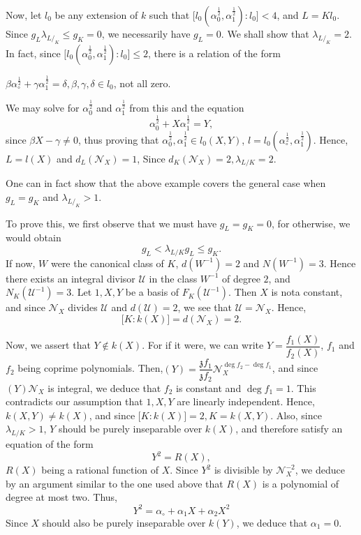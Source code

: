 Now, let $l_0$ be any extension of $k$ such that $\bigg[ l_0
  \left(\alpha^{\frac{1}{2}}_0, \alpha^{\frac{1}{2}}_1\right) : l_0
  \bigg] < 4$, and $L = Kl_0$. Since $g_L \lambda_{L/_K} \leq g_K
= 0$, we necessarily have $g_L = 0$. We shall show that
$\lambda_{L/_K} = 2$. In fact, since $\bigg[ l_0 \left(\alpha
  ^\frac{1}{2}_0, \alpha^{\frac{1}{2}}_1\right) : l_0 \bigg]
\leq 2$, there is a relation of the form 

$\beta \alpha^{\frac{1}{2}}_\circ + \gamma \alpha^{\frac{1}{2}}_1 =
\delta, \beta, \gamma ,\delta \in l_0$, not all zero. 

We may solve for $\alpha^{\frac{1}{2}}_0$ and
$\alpha^{\frac{1}{2}}_1$ from this and the equation 
$$
\alpha^{\frac{1}{2}}_0 + X \alpha^{\frac{1}{2}}_1 = Y,
$$
since $\beta X - \gamma \neq 0$, thus proving that
$\alpha^{\frac{1}{2}}_0, \alpha^{\frac{1}{2}}_1 \in l_0
(X,Y)$, $l=l_0
\left(\alpha^{\frac{1}{2}}_\circ,\alpha^{\frac{1}{2}}_1\right)$. Hence, $L =
l(X)$ and $d_L(\mathscr{N}_X) = 1$, Since $d_K
(\mathscr{N}_X) = 2, \lambda_{L/K} = 2$. 

One can in fact show that the above example covers the general case
when $g_L = g_K$ and $\lambda_{L/_K} > 1$. 

To prove this, we first observe that we must have $g_L = g_K = 0$, for
otherwise, we would obtain 
$$
g_L < \lambda_{L/K} g_L \leq g_K.
$$
If now, $W$ were the canonical class of $K$, $d(W^{-1}) = 2$ and
$N(W^{-1}) = 3$. Hence there exists an integral divisor $\mathscr{U}$
in the class $W^{-1}$ of degree $2$, and $N_K(\mathscr{U}^{-1})
=3$. Let $1, X, Y$ be a basis of $F_K(\mathscr{U}^{-1})$. Then $X$ is
not\pageoriginale a constant, and since $\mathscr{N}_X$ divides $\mathscr{U}$
and $d(\mathscr{U}) = 2$, we see that
$\mathscr{U}=\mathscr{N}_X$. Hence, 
$$
\bigg[ K : k (X) \bigg] = d (\mathscr{N}_X) = 2.
$$

Now, we assert that $Y \notin k (X)$. For if it were, we can write
\break \hbox{$Y= \dfrac{f_1(X)}{f_2(X)}$,} $f_1$ and $f_2$ being coprime
polynomials. Then,\break  $(Y) = \dfrac{\mathfrak{z} f_1}{\mathfrak{z}
  f_2}\mathscr{N}_X^{\deg f_2 - \deg  f_1}$, and since $(Y)
\mathscr{N}_X$ is integral, we 
deduce that $f_2$ is constant and $\deg f_1 = 1$. This contradicts our
assumption that $1, X, Y$ are linearly independent. Hence, $k(X, Y)
\neq k(X)$, and since $\bigg [ K : k(X)\bigg] = 2, K = k(X, Y)$. Also,
since $\lambda_{L/K} > 1$, $Y$ should be purely inseparable over
$k(X)$, and therefore satisfy an equation of the form 
$$
Y^2 = R(X),
$$
$R(X)$ being a rational function of $X$. Since $Y^2$ is divisible by
$\mathscr{N}^{-2}_X$, we deduce by an argument similar to the one
used above that $R(X)$ is a polynomial of degree at most two. Thus, 
$$
Y^2 = \alpha_\circ + \alpha_1 X + \alpha_2 X^2
$$
Since $X$ should also be purely inseparable over $k(Y)$, we deduce
that $\alpha_1 = 0$. 

